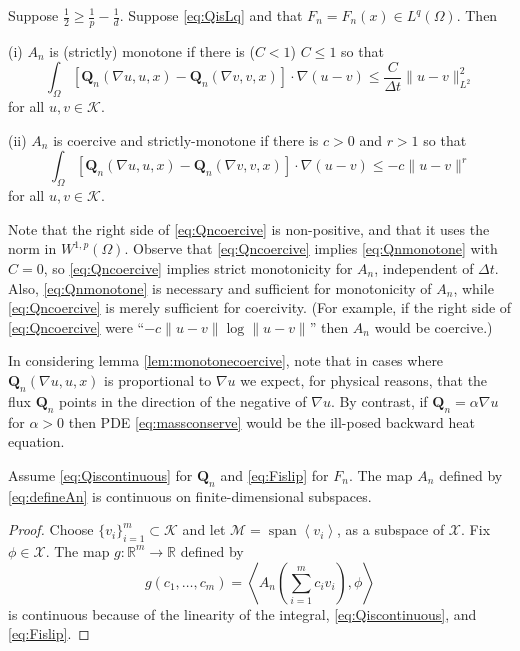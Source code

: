 \documentclass[final,leqno,onefignum,onetabnum]{siamltex1213bueler}
\newcommand\bQ{\mathbf{Q}}
\renewcommand{\grad}{\nabla}
\newcommand{\ip}[2]{\ensuremath{\left<#1,#2\right>}}
\newcommand\RR{\mathbb{R}}
\begin{document}
\begin{lemma}  \label{lem:monotonecoercive}  Suppose $\frac{1}{2} \ge \frac{1}{p} - \frac{1}{d}$.  Suppose \eqref{eq:QisLq} and that $F_n=F_n(x) \in L^q(\Omega)$.  Then

(i)  $A_n$ is (strictly) monotone if there is ($C<1$) $C\le 1$ so that
\begin{equation}
\int_\Omega \left[\bQ_n(\grad u,u,x) - \bQ_n(\grad v,v,x)\right] \cdot \grad(u-v) \le \frac{C}{\Delta t} \|u-v\|_{L^2}^2 \label{eq:Qnmonotone}
\end{equation}
for all $u,v \in \mathcal{K}$.

(ii)  $A_n$ is coercive and strictly-monotone if there is $c>0$ and $r>1$ so that
\begin{equation}
\int_\Omega \left[\bQ_n(\grad u,u,x) - \bQ_n(\grad v,v,x)\right] \cdot \grad(u-v) \le - c \|u-v\|^r \label{eq:Qncoercive}
\end{equation}
for all $u,v \in \mathcal{K}$.
\end{lemma}

Note that the right side of \eqref{eq:Qncoercive} is non-positive, and that it uses the norm in $W^{1,p}(\Omega)$.  Observe that \eqref{eq:Qncoercive} implies \eqref{eq:Qnmonotone} with $C=0$, so \eqref{eq:Qncoercive} implies strict monotonicity for $A_n$, independent of $\Delta t$.  Also, \eqref{eq:Qnmonotone} is necessary and sufficient for monotonicity of $A_n$, while \eqref{eq:Qncoercive} is merely sufficient for coercivity.  (For example, if the right side of \eqref{eq:Qncoercive} were ``$- c \|u-v\| \log \|u-v\|$'' then $A_n$ would be coercive.)

In considering lemma \ref{lem:monotonecoercive}, note that in cases where $\bQ_n(\grad u,u,x)$ is proportional to $\grad u$ we expect, for physical reasons, that the flux $\bQ_n$ points in the direction of the negative of $\grad u$.  By contrast, if $\bQ_n = \alpha \grad u$ for $\alpha>0$ then PDE \eqref{eq:massconserve} would be the ill-posed backward heat equation.

\medskip
\begin{lemma}  \label{lem:continuous}  Assume \eqref{eq:Qiscontinuous} for $\bQ_n$ and \eqref{eq:Fislip} for $F_n$.  The map $A_n$ defined by \eqref{eq:defineAn} is continuous on finite-dimensional subspaces.
\end{lemma}

\begin{proof} Choose $\{v_i\}_{i=1}^m \subset \mathcal{K}$ and let $\mathcal{M}=\operatorname{span}\left<v_i\right>$, as a subspace of $\mathcal{X}$.  Fix $\phi\in\mathcal{X}$.  The map $g:\RR^m \to \RR$ defined by
\begin{equation}
  g(c_1,\dots,c_m) = \ip{A_n\left(\sum_{i=1}^m c_i v_i\right)}{\phi}
\end{equation}
is continuous because of the linearity of the integral, \eqref{eq:Qiscontinuous}, and \eqref{eq:Fislip}.
\end{proof}
\end{document}
